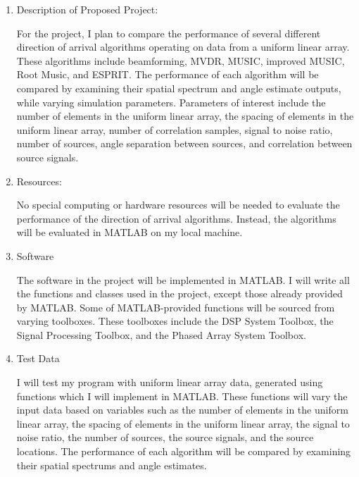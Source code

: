\documentclass{article}
\begin{document}
	\begin{enumerate}
		\item Description of Proposed Project:
		
			For the project, I plan to compare the performance of several different direction of arrival algorithms operating on data from a uniform linear array. These algorithms include beamforming, MVDR, MUSIC, improved MUSIC, Root Music, and ESPRIT. The performance of each algorithm will be compared by examining their spatial spectrum and angle estimate outputs, while varying simulation parameters. Parameters of interest include the number of elements in the uniform linear array, the spacing of elements in the uniform linear array, number of correlation samples, signal to noise ratio, number of sources, angle separation between sources, and correlation between source signals. 
			
		\item Resources:
		
			No special computing or hardware resources will be needed to evaluate the performance of the direction of arrival algorithms. Instead, the algorithms will be evaluated in MATLAB on my local machine.
			
		\item Software
		
			The software in the project will be implemented in MATLAB. I will write all the functions and classes used in the project, except those already provided by MATLAB. Some of MATLAB-provided functions will be sourced from varying toolboxes. These toolboxes include the DSP System Toolbox, the Signal Processing Toolbox, and the Phased Array System Toolbox.
			
		\item Test Data	
			
			I will test my program with uniform linear array data, generated using functions which I will implement in MATLAB. These functions will vary the input data based on variables such as the number of elements in the uniform linear array, the spacing of elements in the uniform linear array, the signal to noise ratio, the number of sources, the source signals, and the source locations. The performance of each algorithm will be compared by examining their spatial spectrums and angle estimates.
			
	\end{enumerate}	
	
	\nocite{doa_algorithms_raghu}
	\nocite{mvdr_montlouis}
	\nocite{capon_sanudin}
	\nocite{music_chowdhury}
	\nocite{improved_music_gupta}
	\nocite{root_music_esprit_patwari}
	\nocite{esprit_ning}
	\newpage
	{}
	
\end{document}
